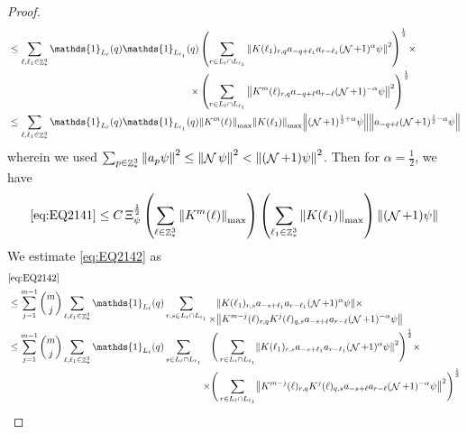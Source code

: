 \documentclass[sn-mathphys, Numbered ,a4paper]{sn-jnl}%
\DeclareMathOperator{\Z}{\mathbb{Z}}
\DeclareMathOperator{\NN}{\mathcal{N}}
\newcommand{\half}{\frac{1}{2}}
\theoremstyle{plain}
\theoremstyle{definition}
\theoremstyle{remark}
\theoremstyle{plain}
\theoremstyle{definition}
\theoremstyle{remark}
\begin{document}
{\begin{proof}
\begin{align}
			&\leq \sum\limits_{\ell, \ell_1\in \Z^3_*} \mathds{1}_{L_{\ell}}(q) \begin{aligned}[t] \mathds{1}_{L_{\ell_1}}(q) &\left(\sum\limits_{r\in L_{\ell} \cap L_{\ell_1}} \norm{ K(\ell_1)_{r,q} a_{-q+\ell_1} a_{r-\ell_1}(\NN+1)^{\alpha}\psi}^2\right)^\half \times \nonumber\\ \times &\left(\sum\limits_{r\in L_{\ell} \cap L_{\ell_1}} \norm{ K^m(\ell)_{r,q} a_{-q+\ell}a_{r-\ell} (\NN+1)^{-\alpha} \psi }^2\right)^\half \end{aligned}\nonumber\\
			&\leq \sum\limits_{\ell, \ell_1\in \Z^3_*} \mathds{1}_{L_{\ell}}(q) \mathds{1}_{L_{\ell_1}}(q)  \norm{K^m(\ell)}_{\mathrm{max}} \norm{ K(\ell_1)}_{\mathrm{max}} \norm{ (\NN+1)^{\half+\alpha} \psi} \norm{  a_{-q+\ell} (\NN+1)^{\half-\alpha} \psi }\nonumber
		\end{align} 
		wherein we used $\sum_{p\in \Z^3_*}\norm{a_p \psi}^2\leq\norm{\NN\psi}^2<\norm{(\NN+1)\psi}^2$. Then for $\alpha =  \half $, we have 
		\begin{equation}
			\eqref{eq:EQ2141}\leq C\, \Xi_{\psi}^\half \left(\sum\limits_{\ell\in \Z^3_*} \norm{K^m(\ell)}_{\mathrm{max}}\right)\left(  \sum\limits_{ \ell_1\in \Z^3_*}  \norm{ K(\ell_1)}_{\mathrm{max}} \right) \norm{ (\NN+1) \psi}\label{eq:estEQ2141} 
		\end{equation}  
		We estimate \eqref{eq:EQ2142} as
		\begin{align}
			&\eqref{eq:EQ2142}\nonumber\\
			&\leq \sum\limits_{j=1}^{m-1} {{m}\choose j} \sum\limits_{\ell, \ell_1\in \Z^3_*}\mathds{1}_{L_{\ell}}(q) \sum\limits_{r,s \in L_{\ell} \cap L_{\ell_1}} \begin{aligned}[t] &\norm{ K(\ell_1)_{r,s}a_{-s+\ell_1} a_{r-\ell_1} (\NN+1)^{\alpha}\psi}\nonumber \times \\ \times&\norm{ K^{m-j}(\ell)_{r,q} K^{j}(\ell)_{q,s} a_{-s+\ell}a_{r-\ell} (\NN+1)^{-\alpha} \psi }\end{aligned} \nonumber\\
			&\leq \sum\limits_{j=1}^{m-1} {{m}\choose j} \sum\limits_{\ell, \ell_1\in \Z^3_*} \mathds{1}_{L_{\ell}}(q)  \sum\limits_{s\in L_{\ell} \cap L_{\ell_1}}   \begin{aligned}[t] \Bigg(\sum\limits_{ r \in L_{\ell} \cap L_{\ell_1}}&\norm{ K(\ell_1)_{r,s}a_{-s+\ell_1} a_{r-\ell_1} (\NN+1)^{\alpha}\psi}^2\Bigg)^\half\nonumber \times \\ \times\Bigg(  \sum\limits_{ r \in L_{\ell} \cap L_{\ell_1}}&\norm{ K^{m-j}(\ell)_{r,q} K^{j}(\ell)_{q,s} a_{-s+\ell}a_{r-\ell} (\NN+1)^{-\alpha} \psi }^2\Bigg)^\half\end{aligned} \nonumber\\

\end{align}
\end{proof}}
\end{document}
